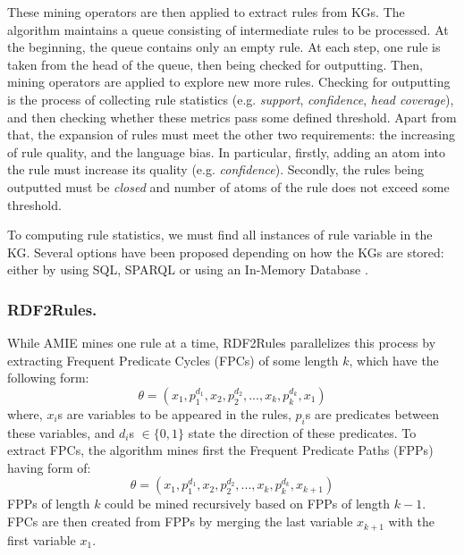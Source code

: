 These mining operators are then applied to extract rules from KGs. The algorithm maintains a queue consisting of intermediate rules to be processed. At the beginning, the queue contains only an empty rule. At each step, one rule is taken from the head of the queue, then being checked for outputting. Then, mining operators are applied to explore new more rules.
Checking for outputting is the process of collecting rule statistics (e.g. \textit{support}, \textit{confidence}, \textit{head coverage}), and then checking whether these metrics pass some defined threshold. Apart from that, the expansion of rules must meet the other two requirements: the increasing of rule quality, and the language bias. In particular, firstly, adding an atom into the rule must increase its quality (e.g. \textit{confidence}). Secondly, the rules being outputted must be \textit{closed} and number of atoms of the rule does not exceed some threshold.

To computing rule statistics, we must find all instances of rule variable in the KG. Several options have been proposed depending on how the KGs are stored: either by using SQL, SPARQL or using an In-Memory Database \cite{amie}.

\subsubsection{RDF2Rules.}
While AMIE mines one rule at a time, RDF2Rules \cite{rdf2rules} parallelizes this process by extracting Frequent Predicate Cycles (FPCs) of some length $k$, which have the following form:
\[\theta = (x_1, p_1^{d_1}, x_2, p_2^{d_2}, ...,x_k, p_k^{d_k}, x_1)\]
where, $x_i$s are variables to be appeared in the rules, $p_i$s are predicates between these variables, and $d_i$s $\in \{0,1\}$ state the direction of these predicates. To extract FPCs, the algorithm mines first the Frequent Predicate Paths (FPPs) having form of:
\[\theta = (x_1, p_1^{d_1}, x_2, p_2^{d_2}, ...,x_k, p_k^{d_k}, x_{k+1})\]
FPPs of length $k$ could be mined recursively based on FPPs of length $k-1$. FPCs are then created from FPPs by merging the last variable $x_{k+1}$ with the first variable $x_1$.

